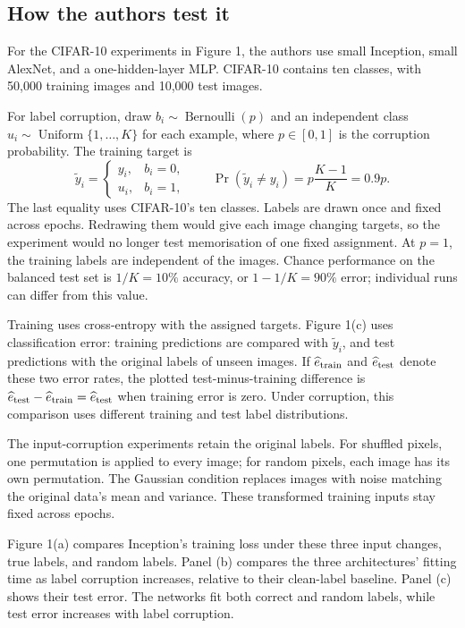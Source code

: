 \documentclass[11pt]{article}
\begin{document}
\subsection{How the authors test it}

For the CIFAR-10 experiments in Figure 1, the authors use small Inception, small AlexNet, and a one-hidden-layer MLP. CIFAR-10 contains ten classes, with 50,000 training images and 10,000 test images.

For label corruption, draw $b_i\sim\operatorname{Bernoulli}(p)$ and an independent class $u_i\sim\operatorname{Uniform}\{1,\ldots,K\}$ for each example, where $p\in[0,1]$ is the corruption probability. The training target is
\[
\widetilde y_i=\begin{cases}y_i,&b_i=0,\\u_i,&b_i=1,\end{cases}
\qquad
\Pr(\widetilde y_i\ne y_i)=p\frac{K-1}{K}=0.9p.
\]
The last equality uses CIFAR-10's ten classes. Labels are drawn once and fixed across epochs. Redrawing them would give each image changing targets, so the experiment would no longer test memorisation of one fixed assignment. At $p=1$, the training labels are independent of the images. Chance performance on the balanced test set is $1/K=10\%$ accuracy, or $1-1/K=90\%$ error; individual runs can differ from this value.

Training uses cross-entropy with the assigned targets. Figure 1(c) uses classification error: training predictions are compared with $\widetilde y_i$, and test predictions with the original labels of unseen images. If $\widehat e_{\rm train}$ and $\widehat e_{\rm test}$ denote these two error rates, the plotted test-minus-training difference is $\widehat e_{\rm test}-\widehat e_{\rm train}=\widehat e_{\rm test}$ when training error is zero. Under corruption, this comparison uses different training and test label distributions.

The input-corruption experiments retain the original labels. For shuffled pixels, one permutation is applied to every image; for random pixels, each image has its own permutation. The Gaussian condition replaces images with noise matching the original data's mean and variance. These transformed training inputs stay fixed across epochs.

Figure 1(a) compares Inception's training loss under these three input changes, true labels, and random labels. Panel (b) compares the three architectures' fitting time as label corruption increases, relative to their clean-label baseline. Panel (c) shows their test error. The networks fit both correct and random labels, while test error increases with label corruption.
\end{document}
